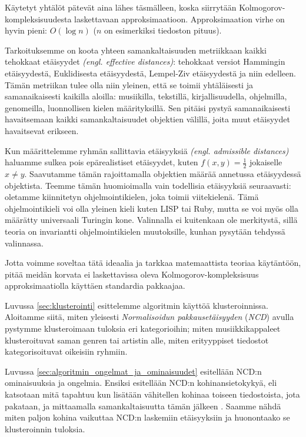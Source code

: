 \documentclass[12pt,finnish,final]{tktltiki2}
\theoremstyle{definition}
\theoremstyle{remark}
\newcommand{\engl}[1]{\emph{(engl. #1)}}
\begin{document}
  Käytetyt yhtälöt pätevät aina lähes täsmälleen, koska siirrytään Kolmogorov-kompleksisuudesta laskettavaan approksimaatioon. Approksimaation virhe on hyvin pieni: $O(\log n)$ ($n$ on esimerkiksi tiedoston pituus).

  Tarkoituksemme on koota yhteen samankaltaisuuden metriikkaan kaikki tehokkaat etäisyydet \engl{effective distances}: tehokkaat versiot Hammingin etäisyydestä, Euklidisesta etäisyydestä, Lempel-Ziv etäisyydestä ja niin edelleen.
  Tämän metriikan tulee olla niin yleinen, että se toimii yhtäläisesti ja samanaikaisesti kaikilla aloilla: musiikilla, tekstillä, kirjallisuudella, ohjelmilla, genomeilla, luonnollisen kielen määrityksillä.
  Sen pitäisi pystyä samanaikaisesti havaitsemaan kaikki samankaltaisuudet objektien välillä, joita muut etäisyydet havaitsevat erikseen.

  Kun määrittelemme ryhmän sallittavia etäisyyksiä \engl{admissible distances} haluamme sulkea pois epärealistiset etäisyydet, kuten $f(x,y) = \frac{1}{2}$ jokaiselle $x \neq y$.
  Saavutamme tämän rajoittamalla objektien määrää annetussa etäisyydessä objektista.
  Teemme tämän huomioimalla vain todellisia etäisyyksiä seuraavasti: oletamme kiinnitetyn ohjelmointikielen, joka toimii viitekielenä.
  Tämä ohjelmointikieli voi olla yleinen kieli kuten LISP tai Ruby, mutta se voi myös olla määrätty universaali Turingin kone. \cite{CV05,cilibrasi2007google}
  Valinnalla ei kuitenkaan ole merkitystä, sillä teoria on invariantti ohjelmointikielen muutoksille, kunhan pysytään tehdyssä valinnassa.


  Jotta voimme soveltaa tätä ideaalia ja tarkkaa matemaattista teoriaa käytäntöön, pitää meidän korvata ei laskettavissa oleva Kolmogorov-kompleksisuus approksimaatiolla käyttäen standardia pakkaajaa.

\label{par:intro-3}
  Luvussa \ref{sec:klusterointi} esittelemme algoritmin käyttöä klusteroinnissa.
  Aloitamme siitä, miten yleisesti \emph{Normalisoidun pakkausetäisyyden} (\emph{NCD}) avulla pystymme klusteroimaan tuloksia eri kategorioihin; miten musiikkikappaleet klusteroituvat saman genren tai artistin alle, miten erityyppiset tiedostot kategorisoituvat oikeisiin ryhmiin.

\label{par:intro-4}
  Luvussa \ref{sec:algoritmin_ongelmat_ja_ominaisuudet} esitellään NCD:n ominaisuuksia ja ongelmia.
  Ensiksi esitellään NCD:n kohinansietokykyä, eli katsotaan mitä tapahtuu kun lisätään vähitellen kohinaa toiseen tiedostoista, jota pakataan, ja mittaamalla samankaltaisuutta tämän jälkeen \cite{4167725}.
  Saamme nähdä miten paljon kohina vaikuttaa NCD:n laskemiin etäisyyksiin ja huonontaako se klusteroinnin tuloksia.
\end{document}
